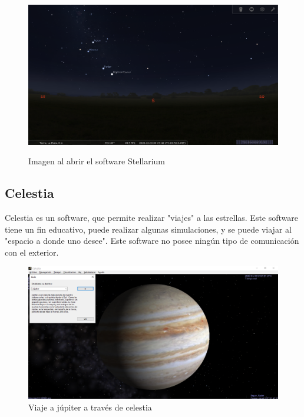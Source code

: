 \begin{figure}[ht]
	\centering
	\includegraphics[width=\linewidth,height= 7cm]{stellarium}
	\caption{Imagen al abrir el software Stellarium }
	\label{fig:stelarium_init}
\end{figure}




\subsection{Celestia} 
Celestia es un software, que permite realizar "viajes" a las estrellas. Este software tiene un fin educativo, puede realizar algunas simulaciones, y se puede viajar al "espacio a donde uno desee". Este software no posee ningún tipo de comunicación con el exterior. 
\begin{figure}[ht]
	\centering
	\includegraphics[scale=0.3]{celestia}
	\caption{Viaje a júpiter a través de celestia}
\end{figure}




